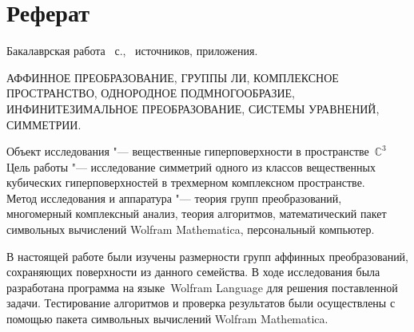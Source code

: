\documentclass[../main.tex]{subfiles}
\begin{document}
\newpage
\section*{\centering Реферат}

\begin{flushleft}
Бакалаврская работа ~с., \ источников,  приложения.\\
\vspace{0.5cm}

АФФИННОЕ ПРЕОБРАЗОВАНИЕ, ГРУППЫ ЛИ, КОМПЛЕКСНОЕ ПРОСТРАНСТВО, ОДНОРОДНОЕ ПОДМНОГООБРАЗИЕ, ИНФИНИТЕЗИМАЛЬНОЕ ПРЕОБРАЗОВАНИЕ, СИСТЕМЫ УРАВНЕНИЙ, СИММЕТРИИ.

\vspace{0.5cm}
Объект исследования "--- вещественные гиперповерхности в пространстве~$\mathbb{C}^3$\\
\vspace{0.5cm}
Цель работы "--- исследование симметрий одного из классов вещественных кубических гиперповерхностей в трехмерном комплексном пространстве.\\
\vspace{0.5cm}
Метод исследования и аппаратура "--- теория групп преобразований, многомерный комплексный анализ, теория алгоритмов, математический пакет символьных вычислений {\ttfamily Wolfram Mathematica}, персональный компьютер.\\
\vspace{0.5cm}

В настоящей работе были изучены размерности групп аффинных преобразований, сохраняющих поверхности из данного семейства. В ходе исследования была разработана программа на языке~{\ttfamily Wolfram Language} для решения поставленной задачи. Тестирование алгоритмов и проверка результатов были осуществлены с помощью пакета символьных вычислений {\ttfamily Wolfram Mathematica}.

\end{flushleft}
\clearpage
\normalsize
\end{document}
